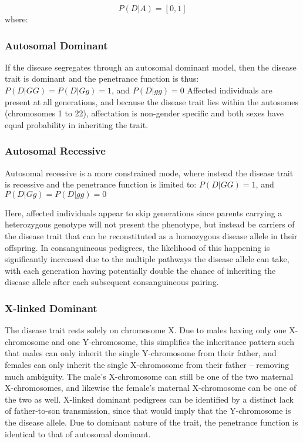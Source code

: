 \begin{equation}
P (D | A) = [0,1]
\end{equation}
where:
\begin{description}
\end{description}


\subsubsection{Autosomal Dominant}

If the disease segregates through an autosomal dominant model, then the disease trait is dominant and the penetrance function is thus:  \(P(D|GG) = P(D|Gg) = 1\), and \(P(D|gg)=0\)
Affected individuals are present at all generations, and because the disease trait lies within the autosomes (chromosomes 1 to 22), affectation is non-gender specific and both sexes have equal probability in inheriting the trait.

\subsubsection{Autosomal Recessive}

Autosomal recessive is a more constrained mode, where instead the disease trait is recessive and the penetrance function is limited to: \(P(D|GG)=1\), and \(P(D|Gg) = P(D|gg) = 0\)

Here, affected individuals appear to skip generations since parents carrying a heterozygous genotype will not present the phenotype, but instead be \gls{carriers} of the disease trait that can be reconstituted as a homozygous disease allele in their offspring. In consanguineous pedigrees, the likelihood of this happening is significantly increased due to the multiple pathways the disease allele can take, with each generation having potentially double the chance of inheriting the disease allele after each subsequent consanguineous pairing.

\subsubsection{X-linked Dominant}

The disease trait rests solely on chromosome X.  Due to males having only one X-chromosome and one Y-chromosome, this simplifies the inheritance pattern such that males can only inherit the single Y-chromosome from their father, and females can only inherit the single  X-chromosome from their father – removing much ambiguity. The male's X-chromosome can still be one of the two maternal X-chromosomes, and likewise the female's maternal X-chromosome can be one of the two as well.  X-linked dominant pedigrees can be identified by a distinct lack of father-to-son transmission, since that would imply that the Y-chromosome is the disease allele. Due to dominant nature of the trait, the penetrance function is identical to that of autosomal dominant.

